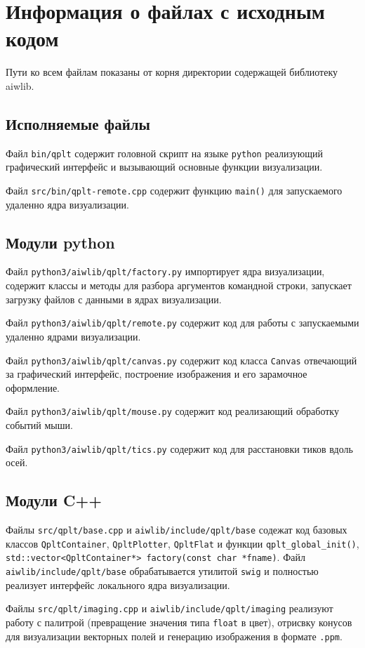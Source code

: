 \documentclass[12pt]{article}
\begin{document}
\section{Информация о файлах с исходным кодом}   %
Пути ко всем файлам показаны от корня директории содержащей библиотеку aiwlib.
\subsection{Исполняемые файлы}
Файл \verb'bin/qplt' содержит головной скрипт на языке \verb'python' реализующий графический интерфейс и вызывающий основные функции визуализации.

Файл \verb'src/bin/qplt-remote.cpp'  содержит функцию \verb'main()' для запускаемого удаленно ядра визуализации.

\subsection{Модули python}
Файл \verb'python3/aiwlib/qplt/factory.py' импортирует ядра визуализации, содержит классы и методы для разбора аргументов командной строки,
запускает загрузку файлов с данными в ядрах визуализации.

Файл \verb'python3/aiwlib/qplt/remote.py' содержит код для работы с запускаемыми удаленно ядрами визуализации.

Файл \verb'python3/aiwlib/qplt/canvas.py' содержит код класса \verb'Canvas' отвечающий за графический интерфейс, построение изображения и его
зарамочное оформление.

Файл \verb'python3/aiwlib/qplt/mouse.py' содержит код реализающий обработку событий мыши.

Файл \verb'python3/aiwlib/qplt/tics.py' содержит код для расстановки тиков вдоль осей.

\subsection{Модули C++}

Файлы \verb'src/qplt/base.cpp' и \verb'aiwlib/include/qplt/base' содежат код базовых классов \verb'QpltContainer',
\verb'QpltPlotter', \verb'QpltFlat' и функции \verb'qplt_global_init()', \verb'std::vector<QpltContainer*> factory(const char *fname)'.
Файл \verb'aiwlib/include/qplt/base' обрабатывается утилитой \verb'swig' и полностью реализует интерфейс локального ядра визуализации. 

Файлы \verb'src/qplt/imaging.cpp' и \verb'aiwlib/include/qplt/imaging' реализуют работу с палитрой (превращение значения типа \verb'float' в цвет),
отрисвку конусов для визуализации векторных полей и генерацию изображения в формате \verb'.ppm'.
\end{document}
